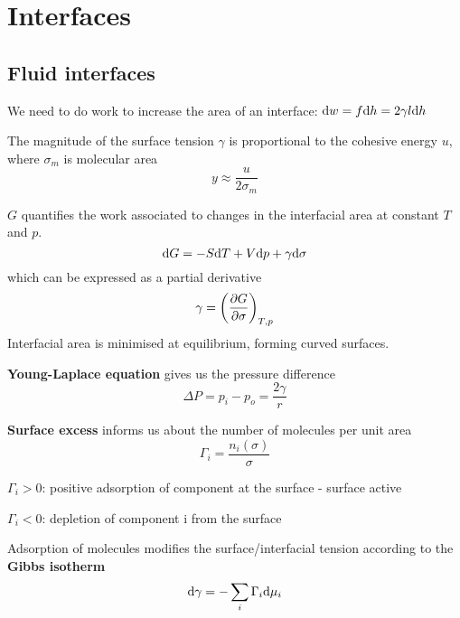 \section{Interfaces}

\subsection*{Fluid interfaces} 
We need to do work to increase the area of an interface:
$\differential w = f \differential h = 2 \gamma l \differential h$

The magnitude of the surface tension $\gamma$ is proportional to the cohesive energy $u$, where $\sigma_m$ is molecular area
\begin{equation*}
    y \approx \frac{u}{2 \sigma_m}
\end{equation*}

$G$ quantifies the work associated to changes in the interfacial area at constant $T$ and $p$.
\begin{equation*}
    \differential G = -S \differential T + V \differential p  + \gamma \differential \sigma
\end{equation*}
which can be expressed as a partial derivative
\begin{equation*}
    \gamma = \left(\pdv{G}{\sigma}\right)_{T,p}
\end{equation*}
Interfacial area is minimised at equilibrium, forming curved surfaces.

\textbf{Young-Laplace equation} gives us the pressure difference
\begin{equation*}
    \Delta P = p_i - p_o = \frac{2 \gamma}{r}
\end{equation*}

\textbf{Surface excess} informs us about the number of molecules per unit area
\begin{equation*}
    \Gamma_i = \frac{n_i(\sigma)}{\sigma}
\end{equation*}

$\Gamma_i > 0$: positive adsorption of component at the surface - surface active

$\Gamma_i < 0$: depletion of component i from the surface

Adsorption of molecules modifies the surface/interfacial tension according to the \textbf{Gibbs isotherm}
\begin{equation*}
    \differential \gamma = - \sum_{i} \Gamma_i \differential \mu_i
\end{equation*}

